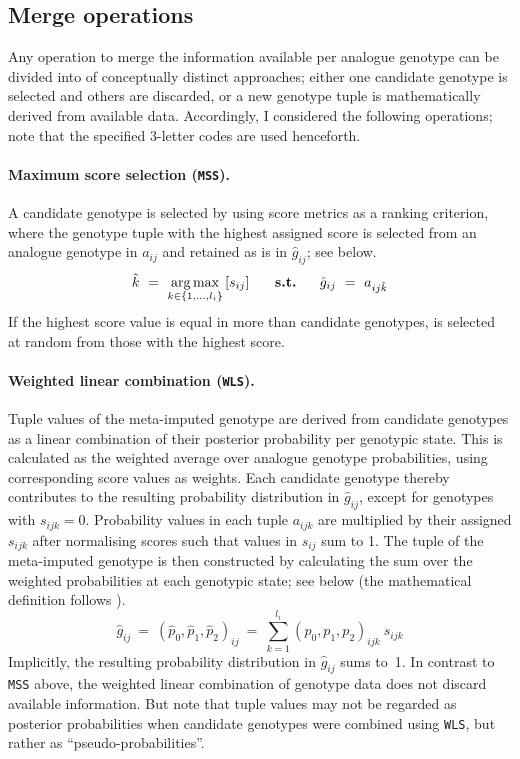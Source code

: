 %
\subsection{Merge operations}
\label{metaimpute_merge}
%

Any operation to merge the information available per analogue genotype can be divided into  of  conceptually distinct approaches; either one candidate genotype is selected and others are discarded, or a new genotype tuple is mathematically derived from available data.
Accordingly, I considered the following  operations; note that the specified 3-letter codes are used henceforth.

\paragraph{Maximum score selection (\texttt{MSS}).}
A candidate genotype is selected by using score metrics as a ranking criterion, where the genotype tuple with the highest assigned score is selected from an analogue genotype in $a_{ij}$ and retained as is in $\hat{g}_{ij}$; see below.
\begin{equation}
	\hat{k} ~=~ \operatorname*{arg\,max}_{k \in \{ 1,\ldots,l_i \}} \left[ s_{ij} \right]
	~ \quad ~ \textbf{s.t.} ~ \quad ~
	\hat{g}_{ij} ~=~ a_{ij\hat{k}}
\end{equation}
If the highest score value is equal in more than  candidate genotypes,  is selected at random from those with the highest score.

\paragraph{Weighted linear combination (\texttt{WLS}).}
Tuple values of the meta-imputed genotype are derived from candidate genotypes as a linear combination of their posterior probability per genotypic state.
This is calculated as the weighted average over analogue genotype probabilities, using corresponding score values as weights.
Each candidate genotype thereby contributes to the resulting probability distribution in $\hat{g}_{ij}$, except for genotypes with $s_{ijk}=0$.
Probability values in each tuple $a_{ijk}$ are multiplied by their assigned $s_{ijk}$ after normalising scores such that values in $s_{ij}$ sum to 1.
The tuple of the meta-imputed genotype is then constructed by calculating the sum over the weighted probabilities at each genotypic state; see below (the mathematical definition follows \citet{Stone:1961js}).
\begin{equation}\label{metaimpute_wlc}
\hat{g}_{ij} ~=~ {\left( \hat{p}_{0}, \hat{p}_{1}, \hat{p}_{2} \right)}_{ij} ~=~
\sum_{k = 1}^{l_i}  {\left( p_{0}, p_{1}, p_{2} \right)}_{ijk} ~ s_{ijk}
\end{equation}
Implicitly, the resulting probability distribution in $\hat{g}_{ij}$ sums to~1.
In contrast to \texttt{MSS} above, the weighted linear combination of genotype data does not discard available information.
But note that tuple values may not be regarded as posterior probabilities when candidate genotypes were combined using \texttt{WLS}, but rather as ``pseudo-probabilities''.



